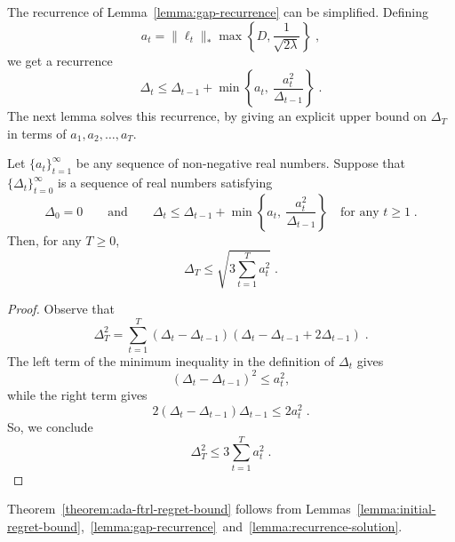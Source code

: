 The recurrence of Lemma~\ref{lemma:gap-recurrence} can be simplified. Defining
$$
a_t = \|\ell_t\|_* \max \left\{D, \frac{1}{\sqrt{2 \lambda}} \right\} \; ,
$$
we get a recurrence
$$
\Delta_t \le \Delta_{t-1} + \min \left\{ a_t, \ \frac{a_t^2}{\Delta_{t-1}} \right\} \; .
$$
The next lemma solves this recurrence, by giving an explicit upper bound on
$\Delta_T$ in terms of $a_1, a_2, \dots, a_T$.

\begin{lemma}
\label{lemma:recurrence-solution}
Let $\{a_t\}_{t=1}^\infty$ be any sequence of non-negative real numbers.
Suppose that $\{\Delta_t\}_{t=0}^\infty$ is a sequence of real numbers
satisfying
$$
\Delta_0 = 0 \qquad \text{and} \qquad
\Delta_t \le \Delta_{t-1} + \min \left\{ a_t, \ \frac{a_t^2}{\Delta_{t-1}} \right\} \quad \text{for any $t \ge 1$} \; .
$$
Then, for any $T \ge 0$,
$$
\Delta_T \le \sqrt{3 \sum_{t=1}^T a_t^2} \; .
$$
\end{lemma}
%
\begin{proof}
Observe that
\[
\Delta_T^2
=
\sum_{t=1}^T (\Delta_t - \Delta_{t-1})(\Delta_t - \Delta_{t-1} + 2\Delta_{t-1}) \; .
\]
The left term of the minimum inequality in the definition of $\Delta_t$ gives
\[
(\Delta_t - \Delta_{t-1})^2 \le a_t^2,
\]
while the right term gives
\[
2 (\Delta_t - \Delta_{t-1}) \Delta_{t-1} \le 2 a_t^2 \; .
\]
So, we conclude
\[
\Delta_T^2
\le
3 \sum_{t=1}^T a_t^2\; .
\]
\end{proof}

Theorem~\ref{theorem:ada-ftrl-regret-bound}
follows from
Lemmas~\ref{lemma:initial-regret-bound},~\ref{lemma:gap-recurrence}~and~\ref{lemma:recurrence-solution}.
